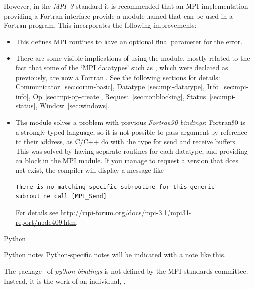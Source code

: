 %
However, in the \emph{MPI~3}%
 standard it is recommended that
an MPI implementation providing a Fortran interface provide a
module named  that can be used in a Fortran program.
This incorporates the following improvements:
\begin{itemize}
\item
  This defines MPI routines to have an optional final parameter for the error.
\item 
  There are some visible implications of using the  module,
  mostly related to the fact that some of the `MPI datatypes' such as
  , which were declared as 
  previously, are now a Fortran .
  See the following sections for details:
  Communicator~\ref{sec:comm-basic}, Datatype~\ref{sec:mpi-datatype},
  Info~\ref{sec:mpi-info}, Op~\ref{sec:mpi-op-create},
  Request~\ref{sec:nonblocking}, Status~\ref{sec:mpi-status},
  Window~\ref{sec:windows}.
\item
  The  module solves a problem with previous
  \emph{Fortran90 bindings}:
  Fortran90 is a strongly typed language, so it is not possible to pass
  argument by reference to their address, as C/C++ do with the 
  type for send and receive buffers. This was solved by having
  separate routines for each datatype, and providing an  block
  in the MPI module. If you manage to request a version that does not exist,
  the compiler will display a message like
\begin{verbatim}
There is no matching specific subroutine for this generic subroutine call [MPI_Send]
\end{verbatim}
%
For details see
\url{http://mpi-forum.org/docs/mpi-3.1/mpi31-report/node409.htm}.
\end{itemize}



 {Python}
\label{sec:python-bind}

\begin{pythonnote}{Python notes}
  Python-specific notes will be indicated with a note like this.
\end{pythonnote}

The  package~\cite{mpi4py:homepage} of \emph{python bindings}
is not defined by the MPI
standards committee. Instead, it is the work of an individual,
.

